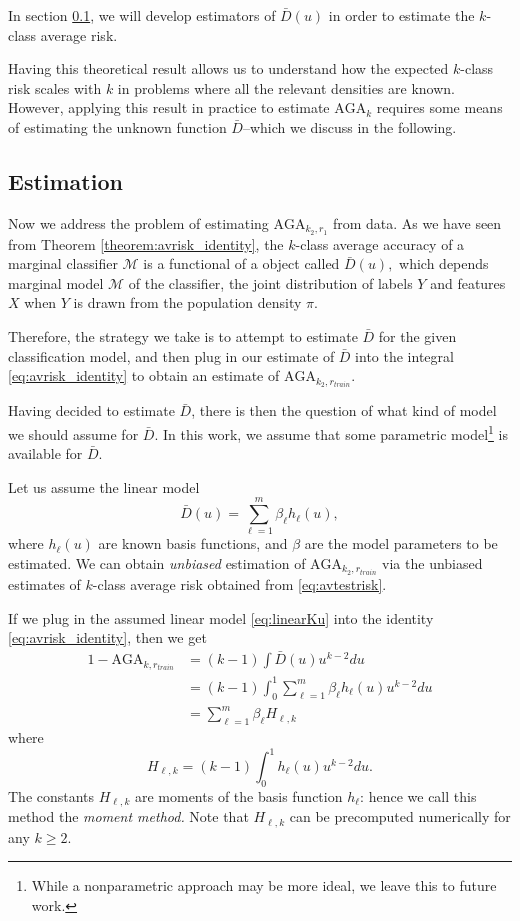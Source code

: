 \documentclass[12pt]{article}
\begin{document}
In section \ref{sec:extrapolation_estimation}, we will develop
estimators of $\bar{D}(u)$ in order to estimate the $k$-class average
risk.

Having this theoretical result allows us to understand how the
expected $k$-class risk scales with $k$ in problems where all the
relevant densities are known.  However, applying this result in
practice to estimate $\text{AGA}_k$ requires some means of
estimating the unknown function $\bar{D}$--which we discuss in the
following.

\subsection{Estimation}\label{sec:extrapolation_estimation}

Now we address the problem of estimating $\text{AGA}_{k_2, r_1}$ from
data.  As we have seen from Theorem \ref{theorem:avrisk_identity}, the
$k$-class average accuracy of a marginal classifier $\mathcal{M}$ is a
functional of a object called $\bar{D}(u),$ which depends marginal
model $\mathcal{M}$ of the classifier, the joint distribution of
labels $Y$ and features $X$ when $Y$ is drawn from the population
density $\pi$.

Therefore, the strategy we take is to attempt to estimate $\bar{D}$
for the given classification model, and then plug in our estimate of
$\bar{D}$ into the integral \eqref{eq:avrisk_identity} to obtain an
estimate of $\text{AGA}_{k_2, r_{train}}$.

Having decided to estimate $\bar{D}$, there is then the question of
what kind of model we should assume for $\bar{D}$.  In this work, we
assume that some parametric model\footnote{While a
nonparametric approach may be more ideal, we leave this to future work.} is available for $\bar{D}$.

Let us assume the linear model
\begin{equation}\label{eq:linearKu}
\bar{D}(u) = \sum_{\ell = 1}^m \beta_\ell h_\ell(u),
\end{equation}
where $h_\ell(u)$ are known basis functions, and $\beta$ are the model
parameters to be estimated. We can obtain \emph{unbiased} estimation
of $\text{AGA}_{k_2, r_{train}}$ via the unbiased estimates of
$k$-class average risk obtained from \eqref{eq:avtestrisk}.

If we plug in the assumed linear model \eqref{eq:linearKu} into the
identity \eqref{eq:avrisk_identity}, then we get
\begin{align}
1 - \text{AGA}_{k, r_{train}} &= (k-1)\int \bar{D}(u) u^{k-2} du
\\&= (k-1)\int_0^1 \sum_{\ell = 1}^m \beta_\ell h_\ell(u) u^{k-2} du
\\&= \sum_{\ell = 1}^m \beta_\ell H_{\ell,k} \label{eq:avrisk_linear}
\end{align}
where
\begin{equation}
H_{\ell,k} = (k-1) \int_0^1 h_\ell(u) u^{k-2} du.
\end{equation}
The constants $H_{\ell, k}$ are moments of the basis function
$h_\ell$: hence we call this method the \emph{moment method.}  Note
that $H_{\ell, k}$ can be precomputed numerically for any $k \geq 2$.
\end{document}
